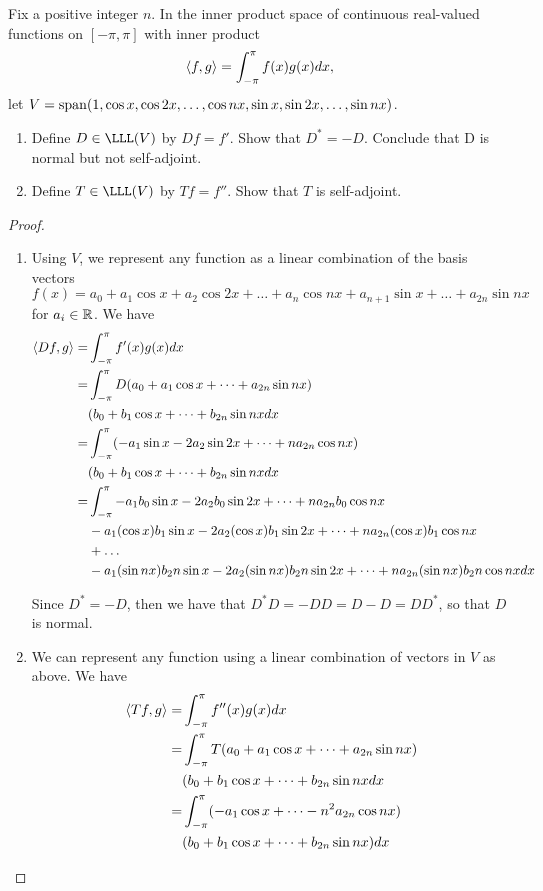 \begin{exercise}{21}
  Fix a positive integer $n$. In the inner product space of continuous real-valued functions on $[-\pi,\pi]$ with inner product 
  \[\langle f,g\rangle=\int_{-\pi}^\pi f(x)g(x)dx,\]
  let $V=\operatorname*{span}(1,\cos x,\cos 2x,\dots,\cos nx,\sin x,\sin 2x,\dots,\sin nx)$.
  \begin{enumerate}
      \item Define $D\in\LLL(V)$ by $Df=f'$. Show that $D^\ast = -D$. Conclude that D is normal but not self-adjoint.
      \item Define $T\in\LLL(V)$ by $Tf=f''$. Show that $T$ is self-adjoint.
  \end{enumerate}
\end{exercise}
\begin{proof}
 \begin{enumerate}
     \item Using $V$, we represent any function as a linear combination of the basis vectors $f(x)=a_0+a_1\cos x+a_2\cos 2x+\dots+a_n\cos nx+a_{n+1}\sin x+\dots+a_{2n}\sin nx$ for $a_i\in\mathbb{R}$. We have
     \begin{align*}
         \langle Df,g\rangle =& \int_{-\pi}^\pi f'(x)g(x)dx\\
         =& \int_{-\pi}^\pi D(a_0+a_1\cos x+\dots+a_{2n}\sin nx)\\
         &(b_0+b_1\cos x+\dots+b_{2n}\sin nx dx\\
         =& \int_{-\pi}^\pi (-a_1\sin x-2a_2\sin 2x+\dots+na_{2n}\cos nx)\\
         &(b_0+b_1\cos x+\dots+b_{2n}\sin nx dx\\
         =& \int_{-\pi}^\pi -a_1b_0\sin x-2a_2b_0\sin 2x+\dots+na_{2n}b_0\cos nx\\
         &-a_1(\cos x) b_1\sin x-2a_2(\cos x)b_1\sin 2x+\dots+na_{2n}(\cos x)b_1\cos nx\\
         &+\dots\\
         &-a_1(\sin nx)b_2n\sin x-2a_2(\sin nx)b_2n\sin 2x+\dots+na_{2n}(\sin nx)b_2n\cos nx dx
     \end{align*}

     Since $D^\ast=-D$, then we have that $D^\ast D =-DD =D-D =DD^\ast$, so that $D$ is normal.
     \item We can represent any function using a linear combination of vectors in $V$ as above. We have
     \begin{align*}
         \langle Tf,g\rangle =& \int_{-\pi}^\pi f''(x)g(x)dx\\
         =& \int_{-\pi}^\pi T(a_0+a_1\cos x+\dots+a_{2n}\sin nx)\\
         &(b_0+b_1\cos x+\dots+b_{2n}\sin nx dx\\
         =& \int_{-\pi}^\pi (-a_1\cos x+\dots-n^2a_{2n}\cos nx)\\
         &(b_0+b_1\cos x+\dots+b_{2n}\sin nx) dx\\
     \end{align*}
 \end{enumerate}


\end{proof}
